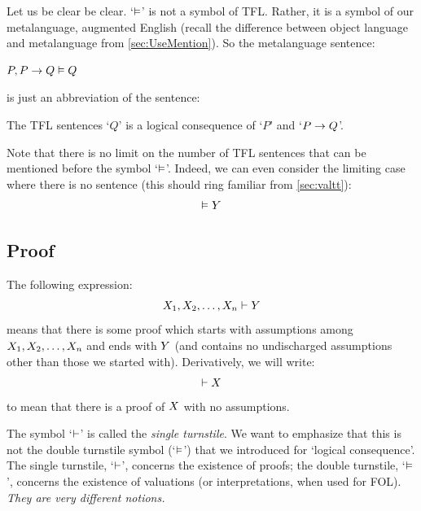 Let us be clear be clear. `$\vDash$' is not a symbol of TFL. Rather, it is a symbol of our metalanguage, augmented English (recall the difference between object language and metalanguage from \cref{sec:UseMention}). So the metalanguage sentence:
\begin{ebullet}
	\item $P, P \rightarrow Q \vDash Q$
\end{ebullet}
is just an abbreviation of the sentence:
\begin{ebullet}
	\item The TFL sentences `$Q$' is a logical consequence of `$P$' and `$P \rightarrow Q$'.
\end{ebullet}
Note that there is no limit on the number of TFL sentences that can be mentioned before the symbol `$\vDash$'. Indeed, we can even consider the limiting case where there is no sentence (this should ring familiar from \cref{sec:valtt}):
$$\vDash Y$$

\subsection{Proof}
The following expression:
$$X_1, X_2, \ldots, X_n \vdash Y$$
means that there is some proof which starts with assumptions among $X_1, X_2, \ldots, X_n$ and ends with $Y$ (and contains no undischarged assumptions other than those we started with). Derivatively, we will write:
$$\vdash X$$
to mean that there is a proof of $X$ with no assumptions.

The symbol `$\vdash$' is called the \emph{single turnstile}. We want to emphasize that this is not the {double turnstile} symbol (`$\vDash$') that we introduced  for `logical consequence'. The single turnstile, `$\vdash$', concerns the existence of proofs; the double turnstile, `$\vDash$', concerns the existence of valuations (or interpretations, when used for FOL). \emph{They are very different notions.}




